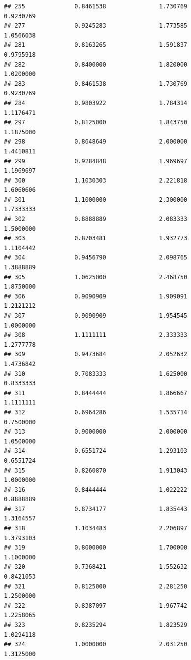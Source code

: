 \documentclass[]{article}
\begin{document}
\begin{verbatim}
## 255              0.8461538               1.730769                0.9230769
## 277              0.9245283               1.773585                1.0566038
## 281              0.8163265               1.591837                0.9795918
## 282              0.8400000               1.820000                1.0200000
## 283              0.8461538               1.730769                0.9230769
## 284              0.9803922               1.784314                1.1176471
## 297              0.8125000               1.843750                1.1875000
## 298              0.8648649               2.000000                1.4410811
## 299              0.9284848               1.969697                1.1969697
## 300              1.1030303               2.221818                1.6060606
## 301              1.1000000               2.300000                1.7333333
## 302              0.8888889               2.083333                1.5000000
## 303              0.8703481               1.932773                1.1104442
## 304              0.9456790               2.098765                1.3888889
## 305              1.0625000               2.468750                1.8750000
## 306              0.9090909               1.909091                1.2121212
## 307              0.9090909               1.954545                1.0000000
## 308              1.1111111               2.333333                1.2777778
## 309              0.9473684               2.052632                1.4736842
## 310              0.7083333               1.625000                0.8333333
## 311              0.8444444               1.866667                1.1111111
## 312              0.6964286               1.535714                0.7500000
## 313              0.9000000               2.000000                1.0500000
## 314              0.6551724               1.293103                0.6551724
## 315              0.8260870               1.913043                1.0000000
## 316              0.8444444               1.022222                0.8888889
## 317              0.8734177               1.835443                1.3164557
## 318              1.1034483               2.206897                1.3793103
## 319              0.8000000               1.700000                1.1000000
## 320              0.7368421               1.552632                0.8421053
## 321              0.8125000               2.281250                1.2500000
## 322              0.8387097               1.967742                1.2258065
## 323              0.8235294               1.823529                1.0294118
## 324              1.0000000               2.031250                1.3125000

\end{verbatim}
\end{document}

